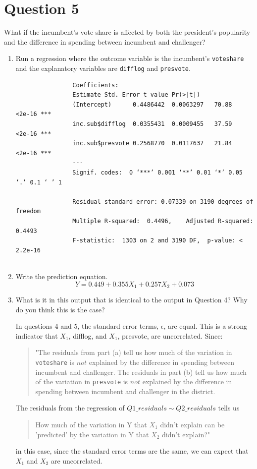 \documentclass[12pt,letterpaper]{article}
\begin{document}
	\newpage	

\section*{Question 5}
\noindent What if the incumbent's vote share is affected by both the president's popularity and the difference in spending between incumbent and challenger? 
	\begin{enumerate}
		\item Run a regression where the outcome variable is the incumbent's \texttt{voteshare} and the explanatory variables are \texttt{difflog} and \texttt{presvote}.	\vspace{.5cm}
		
			  
		\begin{footnotesize}
			
			\begin{verbatim}
				Coefficients:
				Estimate Std. Error t value Pr(>|t|)    
				(Intercept)      0.4486442  0.0063297   70.88   <2e-16 ***
				inc.sub$difflog  0.0355431  0.0009455   37.59   <2e-16 ***
				inc.sub$presvote 0.2568770  0.0117637   21.84   <2e-16 ***
				---
				Signif. codes:  0 ‘***’ 0.001 ‘**’ 0.01 ‘*’ 0.05 ‘.’ 0.1 ‘ ’ 1
				
				Residual standard error: 0.07339 on 3190 degrees of freedom
				Multiple R-squared:  0.4496,	Adjusted R-squared:  0.4493 
				F-statistic:  1303 on 2 and 3190 DF,  p-value: < 2.2e-16
				
			\end{verbatim}
		\end{footnotesize}
		
		\item Write the prediction equation.	\vspace{.5cm}
			$$
					Y = 0.449  + 0.355X_{1} + 0.257X_{2} + 0.073 
			$$
		\item What is it in this output that is identical to the output in Question 4? Why do you think this is the case?
		
		In  questions 4 and 5,  the standard error terms, $\epsilon$,  are equal.  This is a strong indicator that $X_{1}$, difflog,  and $X_{1}$, presvote, are uncorrelated.  
		Since: 
		 \begin{quote}
			"The residuals from part (a) tell us how much of the variation in \texttt{voteshare} is $not$ explained by the difference in spending between incumbent and challenger. 
			The residuals in part (b) tell us how much of the variation in \texttt{presvote} is $not$ explained by the difference in spending between incumbent and challenger in the district.
		\end{quote}
		The residuals from the regression of 
		$Q1\_residuals \sim Q2\_residuals$ 
		tells us 
		\begin{quote}
			How much of the variation in Y that $X_{1}$ didn't explain can be 'predicted' by the variation in Y that $X_{2}$ didn't explain?"
			\end{quote}
		 in this case, since the standard error terms are the same, we can expect that $X_{1}$ and $X_{2}$ are uncorrelated.
		
		
	\end{enumerate}
\end{document}
